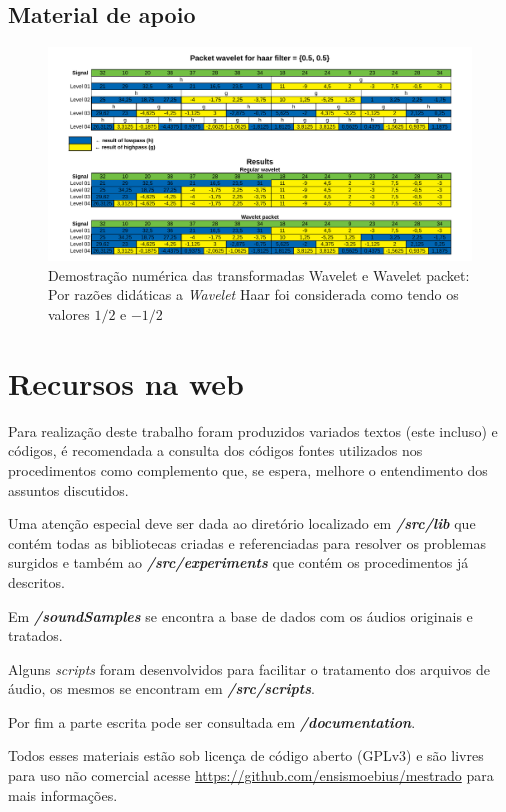 \begin{apendicesenv}
	\partapendices
	\begin{landscape}
		\chapter{Material de apoio}
		\begin{figure}[h]
			\includegraphics[width=.9\linewidth]{images/haarWaveletExamples.pdf}
			\caption{Demostração numérica das transformadas Wavelet e Wavelet packet: Por razões didáticas a \textit{Wavelet} Haar foi considerada como tendo os valores $1/2$ e $-1/2$}
			\label{fig:haarWaveletExamples}
		\end{figure}
	\end{landscape}
	\chapter{Recursos na web}
		\par Para realização deste trabalho foram produzidos variados textos (este incluso) e códigos, é recomendada a consulta dos códigos fontes utilizados nos procedimentos como complemento que, se espera, melhore o entendimento dos assuntos discutidos.
		
		\par Uma atenção especial deve ser dada ao diretório localizado em \textit{\textbf{/src/lib}} que contém todas as bibliotecas criadas e referenciadas para resolver os problemas surgidos e também ao \textit{\textbf{/src/experiments}} que contém os procedimentos já descritos.
				
		\par Em \textit{\textbf{/soundSamples}} se encontra a base de dados com os áudios originais e tratados.
		
		\par Alguns \textit{scripts} foram desenvolvidos para facilitar o tratamento dos arquivos de áudio, os mesmos se encontram em \textbf{\textit{/src/scripts}}.
		
		\par Por fim a parte escrita pode ser consultada em \textit{\textbf{/documentation}}.
		
		\par Todos esses materiais estão sob licença de código aberto (GPLv3) e são livres para uso não comercial acesse   \href{https://github.com/ensismoebius/mestrado}{https://github.com/ensismoebius/mestrado} para mais informações.
\end{apendicesenv}
